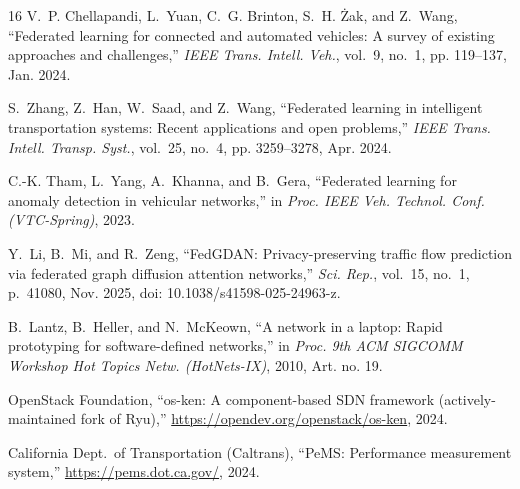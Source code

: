 \documentclass[conference]{IEEEtran}
\begin{document}
\begin{thebibliography}{16}
V.~P. Chellapandi, L.~Yuan, C.~G. Brinton, S.~H. \.{Z}ak, and Z.~Wang,
``Federated learning for connected and automated vehicles: A survey of
existing approaches and challenges,''
\textit{IEEE Trans. Intell. Veh.}, vol.~9, no.~1, pp. 119--137, Jan. 2024.

S.~Zhang, Z.~Han, W.~Saad, and Z.~Wang,
``Federated learning in intelligent transportation systems:
Recent applications and open problems,''
\textit{IEEE Trans. Intell. Transp. Syst.}, vol.~25, no.~4,
pp. 3259--3278, Apr. 2024.

C.-K. Tham, L.~Yang, A.~Khanna, and B.~Gera,
``Federated learning for anomaly detection in vehicular networks,''
in \textit{Proc. IEEE Veh. Technol. Conf. (VTC-Spring)}, 2023.

Y.~Li, B.~Mi, and R.~Zeng,
``FedGDAN: Privacy-preserving traffic flow prediction via federated
graph diffusion attention networks,''
\textit{Sci. Rep.}, vol.~15, no.~1, p.~41080, Nov. 2025,
doi: 10.1038/s41598-025-24963-z.

B.~Lantz, B.~Heller, and N.~McKeown,
``A network in a laptop: Rapid prototyping for software-defined networks,''
in \textit{Proc. 9th ACM SIGCOMM Workshop Hot Topics Netw. (HotNets-IX)},
2010, Art. no. 19.

OpenStack Foundation,
``os-ken: A component-based SDN framework
(actively-maintained fork of Ryu),''
\url{https://opendev.org/openstack/os-ken}, 2024.

California Dept.\ of Transportation (Caltrans),
``PeMS: Performance measurement system,''
\url{https://pems.dot.ca.gov/}, 2024.

\end{thebibliography}
\end{document}
